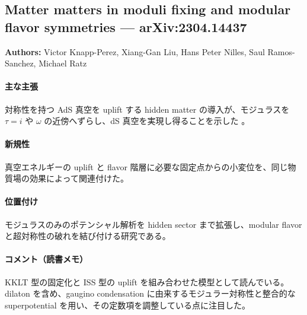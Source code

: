 \subsection{Matter matters in moduli fixing and modular flavor symmetries --- arXiv:2304.14437}

\textbf{Authors:} Victor Knapp-Perez, Xiang-Gan Liu, Hans Peter Nilles, Saul Ramos-Sanchez, Michael Ratz

\paragraph{主な主張}
対称性を持つ AdS 真空を uplift する hidden matter の導入が、モジュラスを $\tau=i$ や $\omega$ の近傍へずらし、dS 真空を実現し得ることを示した \cite{Knapp-Perez:2023nty}。

\paragraph{新規性}
真空エネルギーの uplift と flavor 階層に必要な固定点からの小変位を、同じ物質場の効果によって関連付けた。

\paragraph{位置付け}
モジュラスのみのポテンシャル解析を hidden sector まで拡張し、modular flavor と超対称性の破れを結び付ける研究である。

\paragraph{コメント（読書メモ）}
KKLT 型の固定化と ISS 型の uplift を組み合わせた模型として読んでいる。dilaton を含め、gaugino condensation に由来するモジュラー対称性と整合的な superpotential を用い、その定数項を調整している点に注目した。
